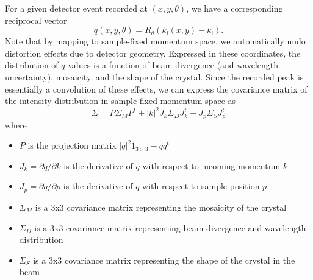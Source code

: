 \documentclass[11pt,a4paper]{article}
\def\si{\text{i}}
\def\sf{\text{f}}
\begin{document}
For a given detector event recorded at $(x,y,\theta)$, we have a corresponding reciprocal vector
\begin{equation} q(x, y, \theta) = R_\theta (k_\sf(x, y) - k_\si). \end{equation}
Note that by mapping to sample-fixed momentum space, we automatically undo distortion effects
due to detector geometry. Expressed in these coordinates, the distribution of $q$ values is a
function of beam divergence (and wavelength uncertainty), mosaicity, and the shape of the crystal.
Since the recorded peak is essentially a convolution of these effects, we can express the covariance
matrix of the intensity distribution in sample-fixed momentum space as
\begin{equation}
  \Sigma = P \Sigma_M P^t + |k|^2 J_k \Sigma_D J_k^t + J_p \Sigma_S J_p^t
\end{equation}
where
\begin{itemize}
  \item $P$ is the projection matrix $|q|^2 1_{3\times 3}-qq^t$
  \item $J_k = \partial q / \partial k$ is the derivative of $q$ with respect to incoming momentum $k$
  \item $J_p = \partial q / \partial p$ is the derivative of $q$ with respect to sample position $p$
  \item $\Sigma_M$ is a 3x3 covariance matrix representing the mosaicity of the crystal
  \item $\Sigma_D$ is a 3x3 covariance matrix representing beam divergence and wavelength distribution
  \item $\Sigma_S$ is a 3x3 covariance matrix representing the shape of the crystal in the beam
\end{itemize}
\end{document}
